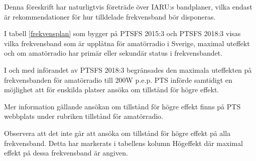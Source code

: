 Denna föreskrift har naturligtvis företräde över IARU:s bandplaner, vilka
endast är rekommendationer för hur tilldelade frekvensband bör disponeras.

I tabell \ref{frekvensplan} som bygger på PTSFS 2015:3 och PTSFS 2018:3 visas
vilka frekvensband som är upplåtna för amatörradio i Sverige, maximal uteffekt
och om amatörradio har primär eller sekundär status i frekvensbandet.

I och med införandet av PTSFS 2018:3 begränsades den maximala uteffekten på
frekvensbanden för amatörradio till 200W p.e.p. PTS införde samtidigt en
möjlighet att för enskilda platser ansöka om tillstånd för högre effekt.

Mer information gällande ansökan om tillstånd för högre effekt finns på PTS
webbplats under rubriken tillstånd för amatörradio.

Observera att det inte går att ansöka om tillstånd för högre effekt på alla
frekvensband. Detta har markerats i tabellens kolumn Högeffekt där maximal
effekt på dessa frekvensband är angiven.

